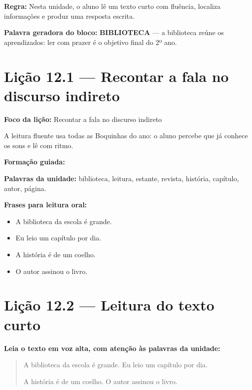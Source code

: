 \textbf{Regra:} Nesta unidade, o aluno lê um texto curto com fluência, localiza informações e produz uma resposta escrita.

\textbf{Palavra geradora do bloco:} \textbf{BIBLIOTECA} --- a biblioteca reúne os aprendizados: ler com prazer é o objetivo final do 2º ano.

\section{Lição 12.1 --- Recontar a fala no discurso indireto}

\textbf{Foco da lição:} Recontar a fala no discurso indireto


\begin{boquinha}
A leitura fluente usa todas as Boquinhas do ano: o aluno percebe que já conhece os sons e lê com ritmo.
\end{boquinha}

\noindent\textbf{Formação guiada:}

\begin{center}
\end{center}

\noindent\textbf{Palavras da unidade:} biblioteca, leitura, estante, revista, história, capítulo, autor, página.

\noindent\textbf{Frases para leitura oral:}
\begin{itemize}[leftmargin=1.6em]
  \item A biblioteca da escola é grande.
  \item Eu leio um capítulo por dia.
  \item A história é de um coelho.
  \item O autor assinou o livro.
\end{itemize}

\section{Lição 12.2 --- Leitura do texto curto}

\noindent\textbf{Leia o texto em voz alta, com atenção às palavras da unidade:}


\begin{quote}
A biblioteca da escola é grande. Eu leio um capítulo por dia.

A história é de um coelho. O autor assinou o livro.
\end{quote}

